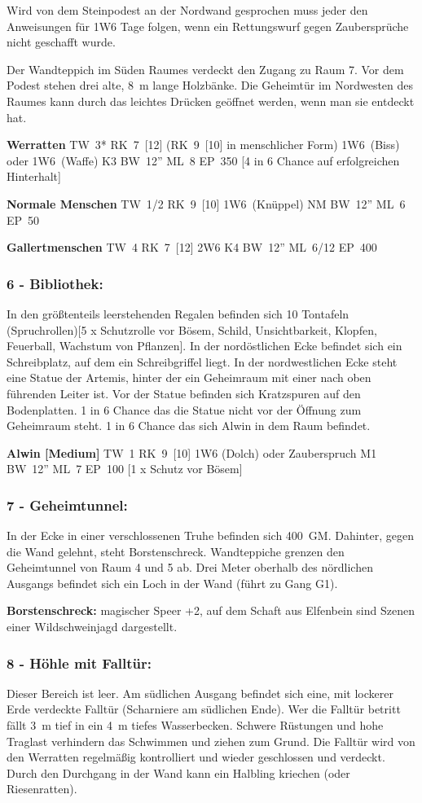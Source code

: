 Wird von dem Steinpodest an der Nordwand gesprochen muss jeder den Anweisungen
für 1W6 Tage folgen, wenn ein Rettungswurf gegen Zaubersprüche nicht geschafft
wurde.

Der Wandteppich im Süden Raumes verdeckt den Zugang zu Raum 7. Vor dem Podest
stehen drei alte, 8~m lange Holzbänke. Die Geheimtür im Nordwesten des Raumes kann
durch das leichtes Drücken geöffnet werden, wenn man sie entdeckt hat.

\textbf{Werratten} TW~3* RK~7~[12] (RK~9~[10]
in menschlicher Form) 1W6~(Biss) oder 1W6~(Waffe) K3 BW~12'' ML~8 EP~350
[4 in 6 Chance auf erfolgreichen Hinterhalt] 

\textbf{Normale Menschen} TW~1/2 RK~9~[10] 1W6~(Knüppel) NM BW~12'' ML~6 EP~50

\textbf{Gallertmenschen} TW~4 RK~7~[12] 2W6 K4 BW~12'' ML~6/12 EP~400

\subsubsection{6 - Bibliothek:} In den größtenteils leerstehenden Regalen
befinden sich 10 Tontafeln (Spruchrollen)[5 x Schutzrolle vor Bösem, Schild,
Unsichtbarkeit, Klopfen, Feuerball, Wachstum von Pflanzen]. In der
nordöstlichen Ecke befindet sich ein Schreibplatz, auf dem ein Schreibgriffel
liegt. In der nordwestlichen Ecke steht eine Statue der Artemis, hinter der ein
Geheimraum mit einer nach oben führenden Leiter ist. Vor der Statue befinden
sich Kratzspuren auf den Bodenplatten. 1 in 6 Chance das die Statue nicht vor
der Öffnung zum Geheimraum steht. 1 in 6 Chance das sich Alwin in dem Raum
befindet.

\textbf{Alwin [Medium]} TW~1 RK~9~[10]
1W6 (Dolch) oder Zauberspruch M1 BW~12'' ML~7 EP~100 [1 x Schutz vor Bösem]
 

\subsubsection{7 - Geheimtunnel:} In der Ecke in einer verschlossenen Truhe
befinden sich 400~GM. Dahinter, gegen die Wand gelehnt, steht Borstenschreck.
Wandteppiche grenzen den Geheimtunnel von Raum 4 und 5 ab. Drei Meter oberhalb
des nördlichen Ausgangs befindet sich ein Loch in der Wand (führt zu Gang G1).

\textbf{Borstenschreck:} magischer Speer +2, auf dem Schaft aus
Elfenbein sind Szenen einer Wildschweinjagd dargestellt.

\subsubsection{8 - Höhle mit Falltür:} Dieser Bereich ist leer. Am südlichen
Ausgang befindet sich eine, mit lockerer Erde verdeckte Falltür (Scharniere am
südlichen Ende). Wer die Falltür betritt fällt 3~m tief in ein 4~m tiefes
Wasserbecken. Schwere Rüstungen und hohe Traglast verhindern das Schwimmen und
ziehen zum Grund.  Die Falltür wird von den Werratten regelmäßig kontrolliert
und wieder geschlossen und verdeckt. Durch den Durchgang in der Wand kann ein
Halbling kriechen (oder Riesenratten).

